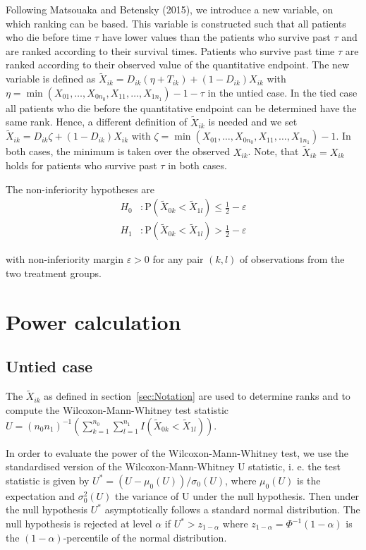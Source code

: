 \documentclass[bimj,fleqn]{w-art}\usepackage[]{graphicx}\usepackage[]{color}
\theoremstyle{plain}
\theoremstyle{definition}
\begin{document}
Following Matsouaka and Betensky (2015), we introduce a new variable, on which
ranking can be based. This variable is constructed such that all patients who
die before time $\tau$ have lower values than the patients who survive past
$\tau$ and are ranked according to their survival times. Patients who survive
past time $\tau$ are ranked according to their observed value of the quantitative
endpoint. The new variable is defined as
$\widetilde{X}_{ik} = D_{ik}(\eta  + T_{ik}) + (1 - D_{ik})X_{ik}$ with
$\eta = \min(X_{01}, \ldots, X_{0n_0}, X_{11}, \ldots, X_{1n_1}) - 1 - \tau$
in the untied case. In the tied case all patients who die before the quantitative endpoint
can be determined have the same rank. Hence, a different definition of $\widetilde{X}_{ik}$
is needed and we set  $\widetilde{X}_{ik} = D_{ik}\zeta   + (1 - D_{ik})X_{ik}$
with $\zeta = \min(X_{01}, \ldots, X_{0n_0}, X_{11}, \ldots, X_{1n_1}) - 1$.
In both cases, the minimum is taken over the observed $X_{ik}$.
Note, that  $\widetilde{X}_{ik} = {X}_{ik}$ holds for patients who survive past $\tau$ in both cases.

  The non-inferiority hypotheses are
\begin{align*}
  H_0 &:  \text{P}(\widetilde{X}_{0k} < \widetilde{X}_{1l})
          \leq \frac{1}{2} - \varepsilon \\
H_1 &:  \text{P}(\widetilde{X}_{0k} < \widetilde{X}_{1l})
          > \frac{1}{2} - \varepsilon
\end{align*}

with non-inferiority margin $\varepsilon > 0$ for any pair $(k, l)$ of
observations from the two treatment groups.

\section{Power calculation}
\label{sec:Power}
\subsection{Untied case}
\label{sec:PowerUntied}
The $\widetilde{X}_{ik}$ as defined in section~\ref{sec:Notation} are used to
  determine ranks and to compute the Wilcoxon-Mann-Whitney test statistic
  $ U =(n_0 n_1)^{-1}(\sum_{k=1}^{n_0}
    \sum_{l=1}^{n_1}I(\widetilde{X}_{0k} < \widetilde{X}_{1l})) $.

  In order to evaluate the power of the Wilcoxon-Mann-Whitney test, we use the
standardised version of the Wilcoxon-Mann-Whitney U statistic, i. e. the test
  statistic is given by $U^* =(U - \mu_0(U)) / \sigma_0(U)$, where $\mu_0(U)$ is the
  expectation and $\sigma^2_0(U)$ the variance of U under the null hypothesis.
  Then under the null hypothesis $U^*$ asymptotically follows a standard normal
  distribution. The null hypothesis is rejected at level $\alpha$ if
  $U^* > z_{1 - \alpha}$ where
$z_{1-\alpha} = \Phi^{-1}({1-\alpha})$ is the $(1 - \alpha)$-percentile of the
normal distribution.
\end{document}
